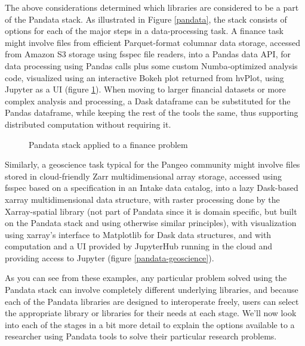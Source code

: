 The above considerations determined which libraries are considered to be a part of the Pandata stack. As illustrated in Figure \ref{pandata}, the stack consists of options for each of the major steps in a data-processing task. A finance task might involve files from efficient Parquet-format columnar data storage, accessed from Amazon S3 storage using fsspec file readers, into a Pandas data API, for data processing using Pandas calls plus some custom Numba-optimized analysis code, visualized using an interactive Bokeh plot returned from hvPlot, using Jupyter as a UI (figure \ref{pandata-finance}). When moving to larger financial datasets or more complex analysis and processing, a Dask dataframe can be substituted for the Pandas dataframe, while keeping the rest of the tools the same, thus supporting distributed computation without requiring it.
\begin{figure}[h]
    \noindent{}
    \caption{Pandata stack applied to a finance problem\label{pandata-finance}}
\end{figure}
Similarly, a geoscience task typical for the Pangeo community might involve files stored in cloud-friendly Zarr multidimensional array storage, accessed using fsspec based on a specification in an Intake data catalog, into a lazy Dask-based xarray multidimensional data structure, with raster processing done by the Xarray-spatial library (not part of Pandata since it is domain specific, but built on the Pandata stack and using otherwise similar principles), with visualization using xarray's interface to Matplotlib for Dask data structures, and with computation and a UI provided by JupyterHub running in the cloud and providing access to Jupyter (figure \ref{pandata-geoscience}).

As you can see from these examples, any particular problem solved using the Pandata stack can involve completely different underlying libraries, and because each of the Pandata libraries are designed to interoperate freely, users can select the appropriate library or libraries for their needs at each stage. We'll now look into each of the stages in a bit more detail to explain the options available to a researcher using Pandata tools to solve their particular research problems.


